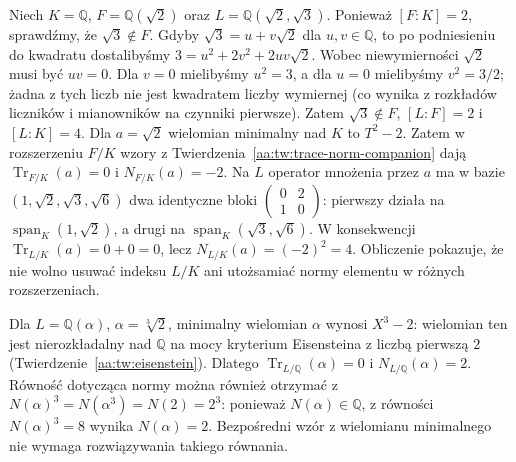 \begin{przyklad}
\label{aa:prz:trace-norm-relative-biquadratic}
Niech $K=\mathbb Q$, $F=\mathbb Q(\sqrt2)$ oraz
$L=\mathbb Q(\sqrt2,\sqrt3)$. Ponieważ $[F:K]=2$, sprawdźmy, że $\sqrt3\notin F$.
Gdyby $\sqrt3=u+v\sqrt2$ dla $u,v\in\mathbb Q$, to po
podniesieniu do kwadratu dostalibyśmy
$3=u^2+2v^2+2uv\sqrt2$. Wobec niewymierności
$\sqrt2$ musi być $uv=0$. Dla $v=0$ mielibyśmy
$u^2=3$, a dla $u=0$ mielibyśmy $v^2=3/2$;
żadna z tych liczb nie jest kwadratem liczby wymiernej
(co wynika z rozkładów liczników i mianowników na
czynniki pierwsze). Zatem $\sqrt3\notin F$,
$[L:F]=2$ i $[L:K]=4$.
Dla $a=\sqrt2$ wielomian minimalny nad $K$ to $T^2-2$.
Zatem w rozszerzeniu $F/K$ wzory z
Twierdzenia~\ref{aa:tw:trace-norm-companion} dają
$\operatorname{Tr}_{F/K}(a)=0$ i $N_{F/K}(a)=-2$.
Na $L$ operator mnożenia przez $a$ ma w bazie
$(1,\sqrt2,\sqrt3,\sqrt6)$ dwa identyczne bloki
$\left(\begin{smallmatrix}0&2\\1&0\end{smallmatrix}\right)$:
pierwszy działa na $\operatorname{span}_K(1,\sqrt2)$,
a drugi na $\operatorname{span}_K(\sqrt3,\sqrt6)$.
W konsekwencji $\operatorname{Tr}_{L/K}(a)=0+0=0$,
lecz $N_{L/K}(a)=(-2)^2=4$.
Obliczenie pokazuje, że nie wolno usuwać indeksu $L/K$
ani utożsamiać normy elementu w różnych rozszerzeniach.
\end{przyklad}

\begin{przyklad}
\label{aa:prz:trace-norm-cubic}
Dla $L=\mathbb Q(\alpha)$, $\alpha=\sqrt[3]2$,
minimalny wielomian $\alpha$ wynosi $X^3-2$:
wielomian ten jest nierozkładalny nad $\mathbb Q$
na mocy kryterium Eisensteina z liczbą pierwszą $2$
(Twierdzenie~\ref{aa:tw:eisenstein}).
Dlatego $\operatorname{Tr}_{L/\mathbb Q}(\alpha)=0$
i $N_{L/\mathbb Q}(\alpha)=2$. Równość dotycząca normy
można również otrzymać z
$N(\alpha)^3=N(\alpha^3)=N(2)=2^3$:
ponieważ $N(\alpha)\in\mathbb Q$, z równości
$N(\alpha)^3=8$ wynika $N(\alpha)=2$.
Bezpośredni wzór z wielomianu minimalnego nie wymaga
rozwiązywania takiego równania.
\end{przyklad}

